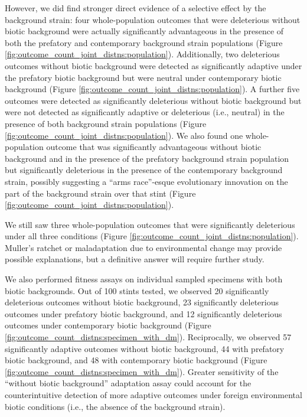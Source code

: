 However, we did find stronger direct evidence of a selective effect by the background strain: four whole-population outcomes that were deleterious without biotic background were actually significantly advantageous in the presence of both the prefatory and contemporary background strain populations (Figure \ref{fig:outcome_count_joint_distns:population}).
Additionally, two deleterious outcomes without biotic background were detected as significantly adaptive under the prefatory biotic background but were neutral under contemporary biotic background (Figure \ref{fig:outcome_count_joint_distns:population}).
A further five outcomes were detected as significantly deleterious without biotic background but were not detected as significantly adaptive or deleterious (i.e., neutral) in the presence  of both background strain populations (Figure \ref{fig:outcome_count_joint_distns:population}).
We also found one whole-population outcome that was significantly advantageous without biotic background and in the presence of the prefatory background strain population but significantly deleterious in the presence of the contemporary background strain, possibly suggesting a ``arms race''-esque evolutionary innovation on the part of the background strain over that stint (Figure \ref{fig:outcome_count_joint_distns:population}).

We still saw three whole-population outcomes that were significantly deleterious under all three conditions (Figure \ref{fig:outcome_count_joint_distns:population}).
Muller's ratchet \citep{andersson1996muller} or maladaptation due to environmental change \citep{brady2019causes} may provide possible explanations, but a definitive answer will require further study.

We also performed fitness assays on individual sampled specimens with both biotic backgrounds.
Out of 100 stints tested, we observed 20 significantly deleterious outcomes without biotic background, 23 significantly deleterious outcomes under prefatory biotic background, and 12 significantly deleterious outcomes under contemporary biotic background (Figure \ref{fig:outcome_count_distns:specimen_with_dm}).
Reciprocally, we observed 57 significantly adaptive outcomes without biotic background, 44 with prefatory biotic background, and 48 with contemporary biotic background (Figure \ref{fig:outcome_count_distns:specimen_with_dm}).
Greater sensitivity of the ``without biotic background'' adaptation assay could account for the counterintuitive detection of more adaptive outcomes under foreign environmental biotic conditions (i.e., the absence of the background strain).

